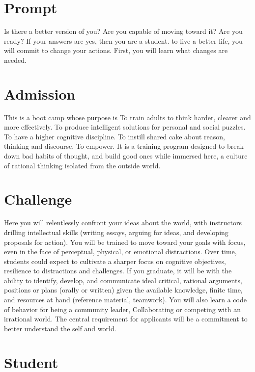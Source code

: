 \documentclass[
]{book}
\begin{document}
\hypertarget{prompt}{%
\section{Prompt}\label{prompt}}

Is there a better version of you?
Are you capable of moving toward it?
Are you ready?
If your answers are yes, then you are a student. to live a better life, you will commit to change your actions.
First, you will learn what changes are needed.

\hypertarget{admission}{%
\section{Admission}\label{admission}}

This is a boot camp whose purpose is
To train adults to think harder, clearer and more effectively.
To produce intelligent solutions for personal and social puzzles.
To have a higher cognitive discipline.
To instill shared cake about reason, thinking and discourse.
To empower.
It is a training program designed to break down bad habits of thought, and build good ones while immersed here, a culture of rational thinking isolated from the outside world.

\hypertarget{challenge}{%
\section{Challenge}\label{challenge}}

Here you will relentlessly confront your ideas about the world, with instructors drilling intellectual skills (writing essays, arguing for ideas, and developing proposals for action).
You will be trained to move toward your goals with focus, even in the face of perceptual, physical, or emotional distractions.
Over time, students could expect to cultivate a sharper focus on cognitive objectives, resilience to distractions and challenges.
If you graduate, it will be with the ability to identify, develop, and communicate ideal critical, rational arguments, positions or plans (orally or written) given the available knowledge, finite time, and resources at hand (reference material, teamwork).
You will also learn a code of behavior for being a community leader,
Collaborating or competing with an irrational world.
The central requirement for applicants will be a commitment to better understand the self and world.

\hypertarget{student}{%
\section{Student}\label{student}}
\end{document}
